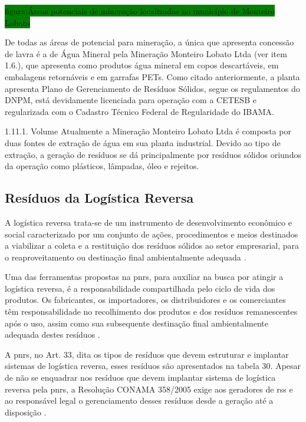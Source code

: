 	\colorbox{green}{figura:Áreas potenciais de mineração localizadas no município de Monteiro Lobato}

	De todas as áreas de potencial para mineração, a única que apresenta concessão de lavra é a de Água Mineral pela Mineração Monteiro Lobato Ltda (ver item 1.6.), que apresenta como produtos água mineral em copos descartáveis, em embalagens retornáveis e em garrafas PETs. Como citado anteriormente, a planta apresenta Plano de Gerenciamento de Resíduos Sólidos, segue os regulamentos do DNPM, está devidamente licenciada para operação com a CETESB e regularizada com o Cadastro Técnico Federal de Regularidade do IBAMA.
	
	1.11.1. Volume
	Atualmente a Mineração Monteiro Lobato Ltda é composta por duas fontes de extração de água em sua planta industrial. Devido ao tipo de extração, a geração de resíduos se dá principalmente por resíduos sólidos oriundos da operação como plásticos, lâmpadas, óleo e rejeitos.
	
	
	\subsection{Resíduos da Logística Reversa}
	A logística reversa trata-se de um instrumento de desenvolvimento econômico e social caracterizado por um conjunto de ações, procedimentos e meios destinados a viabilizar a coleta e a restituição dos resíduos sólidos ao setor empresarial, para o reaproveitamento ou destinação final ambientalmente adequada \cite{brasil:12305}. 
	
	Uma das ferramentas propostas na \gls{pnrs}, para auxiliar na busca por atingir a logística reversa, é a responsabilidade compartilhada pelo ciclo de vida dos produtos. Os fabricantes, os importadores, os distribuidores e os comerciantes têm responsabilidade no recolhimento dos produtos e dos resíduos remanescentes após o uso, assim como sua subsequente destinação final ambientalmente adequada destes resíduos \cite{brasil:12305}.
	
	A \gls{pnrs}, no Art. 33, dita os tipos de resíduos que devem estruturar e implantar sistemas de logística reversa, esses resíduos são apresentados na tabela 30. Apesar de não se enquadrar nos resíduos que devem implantar sistema de logística reversa pela \gls{pnrs}, a Resolução CONAMA 358/2005 exige aos geradores de \gls{rss} e ao responsável legal o gerenciamento desses resíduos desde a geração até a disposição \cite{conama:358}.
	
	
	
